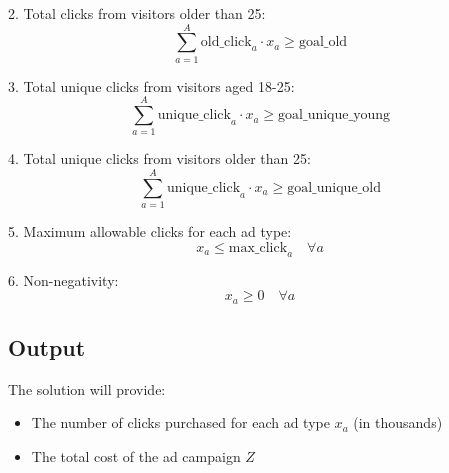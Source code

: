 \documentclass{article}
\begin{document}
2. Total clicks from visitors older than 25:
\[
\sum_{a=1}^{A} \text{old\_click}_a \cdot x_a \geq \text{goal\_old}
\]

3. Total unique clicks from visitors aged 18-25:
\[
\sum_{a=1}^{A} \text{unique\_click}_a \cdot x_a \geq \text{goal\_unique\_young}
\]

4. Total unique clicks from visitors older than 25:
\[
\sum_{a=1}^{A} \text{unique\_click}_a \cdot x_a \geq \text{goal\_unique\_old}
\]

5. Maximum allowable clicks for each ad type:
\[
x_a \leq \text{max\_click}_a \quad \forall a
\]

6. Non-negativity:
\[
x_a \geq 0 \quad \forall a
\]

\subsection*{Output}
The solution will provide:
\begin{itemize}
    \item The number of clicks purchased for each ad type \( x_a \) (in thousands)
    \item The total cost of the ad campaign \( Z \)
\end{itemize}
\end{document}
